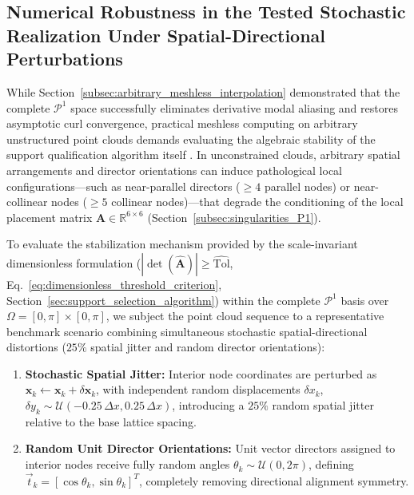 \documentclass[preprint,12pt]{elsarticle}
\begin{document}
\subsection{Numerical Robustness in the Tested Stochastic Realization Under Spatial-Directional Perturbations}
\label{subsec:stochastic_perturbations}

While Section~\ref{subsec:arbitrary_meshless_interpolation} demonstrated that the complete $\mathcal{P}^1$ space successfully eliminates derivative modal aliasing and restores asymptotic curl convergence, practical meshless computing on arbitrary unstructured point clouds demands evaluating the algebraic stability of the support qualification algorithm itself \cite{slak2018refined}. In unconstrained clouds, arbitrary spatial arrangements and director orientations can induce pathological local configurations---such as near-parallel directors ($\ge 4$ parallel nodes) or near-collinear nodes ($\ge 5$ collinear nodes)---that degrade the conditioning of the local placement matrix $\mathbf{A} \in \mathbb{R}^{6 \times 6}$ (Section~\ref{subsec:singularities_P1}).

To evaluate the stabilization mechanism provided by the scale-invariant dimensionless formulation ($|\det(\widehat{\mathbf{A}})| \ge \widehat{\mathrm{Tol}}$, Eq.~\eqref{eq:dimensionless_threshold_criterion}, Section~\ref{sec:support_selection_algorithm}) within the complete $\mathcal{P}^1$ basis over $\Omega = [0, \pi] \times [0, \pi]$, we subject the point cloud sequence to a representative benchmark scenario combining simultaneous stochastic spatial-directional distortions ($25\%$ spatial jitter and random director orientations):
\begin{enumerate}
    \item \textbf{Stochastic Spatial Jitter:} Interior node coordinates are perturbed as $\mathbf{x}_k \leftarrow \mathbf{x}_k + \delta\mathbf{x}_k$, with independent random displacements $\delta x_k$, $\delta y_k \sim \mathcal{U}(-0.25\,\Delta x, 0.25\,\Delta x)$, introducing a $25\%$ random spatial jitter relative to the base lattice spacing.
    \item \textbf{Random Unit Director Orientations:} Unit vector directors assigned to interior nodes receive fully random angles $\theta_k \sim \mathcal{U}(0, 2\pi)$, defining $\vec{t}_k = [\cos\theta_k, \sin\theta_k]^T$, completely removing directional alignment symmetry.
\end{enumerate}
\end{document}
